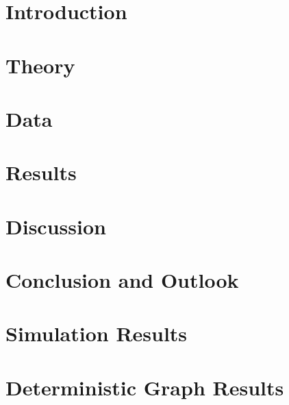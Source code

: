 \documentclass[12pt]{report}
\begin{document}
  \printacronyms[include=abbrev,name=List of Abbreviations]
  \newpage

  \onehalfspacing
  \chapter{Introduction}
  


  \chapter{Theory}
  \label{section:theory}
  
  \newpage
 

  \chapter{Data}
  \label{section:data}
  
  \newpage
  
  \chapter{Results}
  \label{section:results}
  
  \newpage
  
  \chapter{Discussion}
  \label{section:discussion}
  
  \newpage

  \chapter{Conclusion and Outlook}
  \label{section:conclusion_outlook}
  
  \newpage


  \renewcommand\bibname{References}
  
  \newpage

  \appendix
  \chapter{Simulation Results}
  
  \newpage

  \chapter{Deterministic Graph Results}
  \label{app:det_graphs}
  
  \newpage
\end{document}
